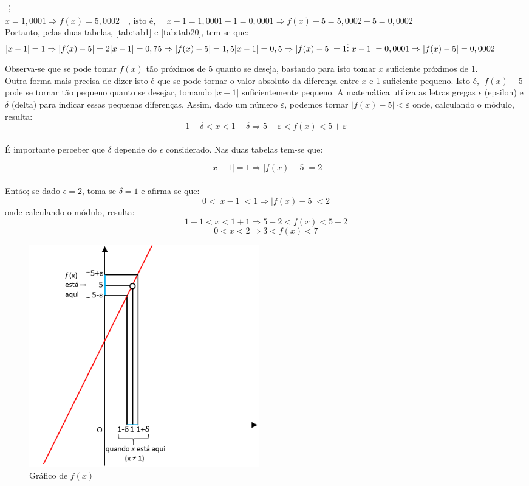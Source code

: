\vdots \\
$ x = 1,0001 \Rightarrow f(x) = 5,0002 \quad \textrm{, isto é, } \quad x-1=1,0001-1= 0,0001\Rightarrow f(x) - 5 = 5,0002-5 = 0,0002$\\
Portanto, pelas duas tabelas, \ref{tab:tab1} e \ref{tab:tab20}, tem-se que:\\
$
\vert x-1 \vert = 1 \Rightarrow \vert f(x) -5 \vert = 2 \\
\vert x-1 \vert = 0,75 \Rightarrow \vert f(x) -5 \vert = 1,5 \\
\vert x-1 \vert = 0,5 \Rightarrow \vert f(x) -5 \vert = 1 \\
\vdots \\
\vert x-1 \vert = 0,0001 \Rightarrow \vert f(x) -5 \vert = 0,0002 
$

Observa-se que se pode tomar $f(x)$ tão próximos de 5 quanto se deseja, bastando para isto tomar $x$  suficiente próximos de 1.\\

Outra forma mais precisa de dizer isto é que se pode tornar o valor absoluto da diferença entre $x$ e 1 suficiente  pequeno. Isto é, $|f(x)-5|$ pode se tornar tão pequeno quanto se desejar, tomando $|x-1|$ suficientemente pequeno.  A matemática utiliza as letras gregas $\epsilon$ (epsilon) e $\delta$ (delta) para indicar essas pequenas diferenças. Assim, dado um número $\varepsilon$, podemos  tornar $\vert f(x) - 5\vert < \varepsilon$ onde, calculando o módulo, resulta:
$$1 - \delta < x < 1 + \delta \Rightarrow 5 - \varepsilon < f(x) < 5 + \varepsilon$$\\
É importante perceber que $\delta$ depende do $\epsilon$ considerado. Nas duas tabelas tem-se que:

$$
\vert x - 1 \vert = 1 \Rightarrow \vert  f(x) - 5 \vert = 2
$$\\
Então; se dado $\epsilon = 2$, toma-se $\delta = 1$ e afirma-se que: $$0 < \vert x -1 \vert < 1 \Rightarrow \vert f(x) - 5 \vert < 2$$
onde calculando o módulo, resulta:
$$1 - 1 < x < 1+1 \Rightarrow 5 -2 < f(x) < 5+2$$
$$0 < x < 2 \Rightarrow 3 < f(x) < 7 $$
\begin{figure}[H]
\centering %
\includegraphics[width=10cm]{img/img2.png} %
\caption{Gráfico de $f(x)$}
\label{fig:img2}
\end{figure}



